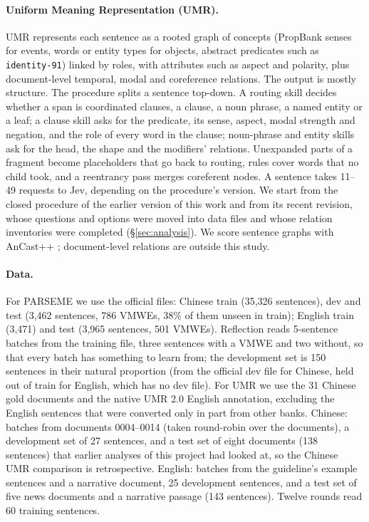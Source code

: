\paragraph{Uniform Meaning Representation (UMR).}
UMR \citep{bonn2023umr,bonn2025umr2} represents each sentence as a rooted graph of concepts (PropBank senses for events, words or entity types for objects, abstract predicates such as \texttt{identity-91}) linked by roles, with attributes such as aspect and polarity, plus document-level temporal, modal and coreference relations. The output is mostly structure. The procedure splits a sentence top-down. A routing skill decides whether a span is coordinated clauses, a clause, a noun phrase, a named entity or a leaf; a clause skill asks for the predicate, its sense, aspect, modal strength and negation, and the role of every word in the clause; noun-phrase and entity skills ask for the head, the shape and the modifiers' relations. Unexpanded parts of a fragment become placeholders that go back to routing, rules cover words that no child took, and a reentrancy pass merges coreferent nodes. A sentence takes 11--49 requests to Jev, depending on the procedure's version. We start from the closed procedure of the earlier version of this work and from its recent revision, whose questions and options were moved into data files and whose relation inventories were completed (\S\ref{sec:analysis}). We score sentence graphs with AnCast++ \citep{sun2024ancast}; document-level relations are outside this study.

\paragraph{Data.}
For PARSEME we use the official files: Chinese train (35,326 sentences), dev and test (3,462 sentences, 786 VMWEs, 38\% of them unseen in train); English train (3,471) and test (3,965 sentences, 501 VMWEs). Reflection reads 5-sentence batches from the training file, three sentences with a VMWE and two without, so that every batch has something to learn from; the development set is 150 sentences in their natural proportion (from the official dev file for Chinese, held out of train for English, which has no dev file). For UMR we use the 31 Chinese gold documents and the native UMR 2.0 English annotation, excluding the English sentences that were converted only in part from other banks. Chinese: batches from documents 0004--0014 (taken round-robin over the documents), a development set of 27 sentences, and a test set of eight documents (138 sentences) that earlier analyses of this project had looked at, so the Chinese UMR comparison is retrospective. English: batches from the guideline's example sentences and a narrative document, 25 development sentences, and a test set of five news documents and a narrative passage (143 sentences). Twelve rounds read 60 training sentences.
